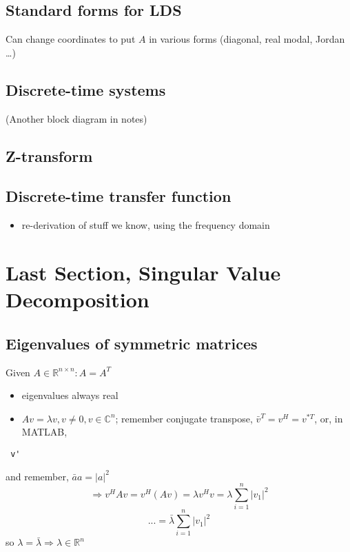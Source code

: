 \documentclass[10pt,letterpaper]{article}
\begin{document}
\subsection{Standard forms for LDS}
\label{sec-13_6}

Can change coordinates to put $A$ in various forms (diagonal, real modal, Jordan \ldots{})
\subsection{Discrete-time systems}
\label{sec-13_7}

(Another block diagram in notes)
\subsection{Z-transform}
\label{sec-13_8}
\subsection{Discrete-time transfer function}
\label{sec-13_9}

\begin{itemize}
\item re-derivation of stuff we know, using the frequency domain
\end{itemize}
\section{Last Section, Singular Value Decomposition}
\label{sec-14}
\subsection{Eigenvalues of symmetric matrices}
\label{sec-14_1}

Given $A \in \mathbb{R}^{n\times n}:A=A ^{T}$ 
\begin{itemize}
\item eigenvalues always real
\item $Av=\lambda v, v\ne 0,v\in \mathbb C^n$; remember conjugate transpose, $\bar v ^{T}=v ^{H} = v ^{*T}$, or, in MATLAB,
\end{itemize}
\begin{verbatim}
 v'
\end{verbatim}

and remember, $\bar a a= |a| ^{2}$ 
$$
\Rightarrow v ^{H} Av= v ^{H} (Av) = \lambda v ^{H} v = \lambda \sum ^{n} _{i=1} |v_1| ^{2} 
$$ 
$$ 
...= \bar \lambda \sum ^{n} _{i=1} |v_1| ^{2} 
$$ 
so $\lambda = \bar \lambda \Rightarrow \lambda \in \mathbb{R}^{n}$
\end{document}

